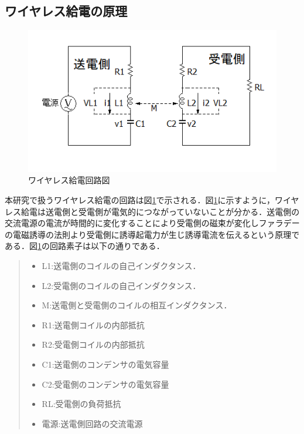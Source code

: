 \documentclass[12pt]{jarticle}
\begin{document}
\subsection{ワイヤレス給電の原理}
\begin{figure}[h]
	\centering
	\includegraphics[]{wpt_2020128.png}
	\caption{ワイヤレス給電回路図}
	\label{fig:wpt_kairo}
\end{figure}
本研究で扱うワイヤレス給電の回路は図\ref{fig:wpt_kairo}で示される．図\ref{fig:wpt_kairo}に示すように，ワイヤレス給電は送電側と受電側が電気的につながっていないことが分かる．送電側の交流電源の電流が時間的に変化することにより受電側の磁束が変化しファラデーの電磁誘導の法則より受電側に誘導起電力が生じ誘導電流を伝えるという原理である．図\ref{fig:wpt_kairo}の回路素子は以下の通りである．
\begin{quote}
	\begin{itemize}
		\item L1:送電側のコイルの自己インダクタンス．
		\item L2:受電側のコイルの自己インダクタンス．
		\item M:送電側と受電側のコイルの相互インダクタンス．
		\item R1:送電側コイルの内部抵抗
		\item R2:受電側コイルの内部抵抗
		\item C1:送電側のコンデンサの電気容量
		\item C2:受電側のコンデンサの電気容量
		\item RL:受電側の負荷抵抗
		\item 電源:送電側回路の交流電源
	\end{itemize}
\end{quote}
\clearpage
\end{document}
